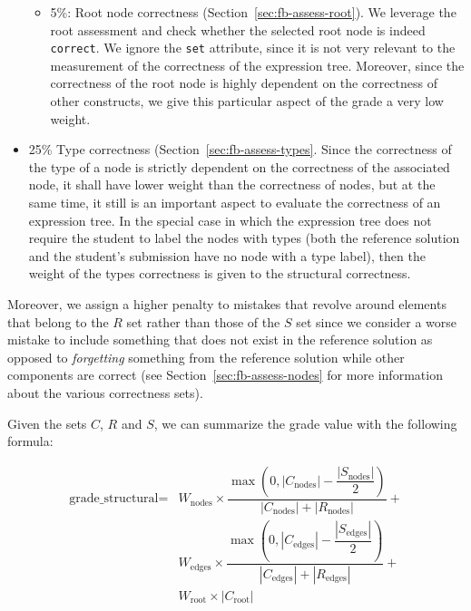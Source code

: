 \begin{chapterBody}
\begin{itemize}
\begin{itemize}
    \item 5\%: Root node correctness (Section~\ref{sec:fb-assess-root}). We 
leverage the root assessment and check whether the selected root node is
indeed \texttt{correct}. We ignore the \texttt{set} attribute, since
it is not very relevant to the measurement of the correctness of the
expression tree. Moreover, since the correctness of the root node is highly
dependent on the correctness of other constructs, we give this particular
aspect of the grade a very low weight.
    \end{itemize}
    \item 25\% Type correctness (Section~\ref{sec:fb-assess-types}. Since the
correctness of the type of a node is strictly dependent on the correctness of
the associated node, it shall have lower weight than the correctness of nodes,
but at the same time, it still is an important aspect to evaluate the correctness
of an expression tree. In the special case in which the expression tree does
not require the student to label the nodes with types (both the reference
solution and the student's submission have no node with a type label), then the
weight of the types correctness is given to the structural correctness.
\end{itemize}

Moreover, we assign a higher penalty to mistakes that revolve around elements
that belong to the $ R $ set rather than those of the $ S $ set since we 
consider a worse mistake to include something that does not exist in the
reference solution as opposed to \textit{forgetting} something from the
reference solution while other components are correct (see
Section~\ref{sec:fb-assess-nodes} for more information about the various
correctness sets).

Given the sets $ C $, $ R $ and $ S $, we can summarize the grade value with
the following formula:

\begin{equation*}
\begin{split}
\text{grade\_structural} =
  & W_{\text{nodes}} \times \dfrac{
    \max \left(
      0,
      \left| C_{\text{nodes}} \right| -
      \dfrac{\left| S_{\text{nodes}} \right|}{2}
    \right) 
  }{
    \left| C_{\text{nodes}} \right| + \left| R_{\text{nodes}} \right|
  } + \\
  & W_{\text{edges}} \times \dfrac{
    \max \left(
      0,
      \left| C_{\text{edges}} \right| -
      \dfrac{\left| S_{\text{edges}} \right|}{2}
    \right) 
  }{
    \left| C_{\text{edges}} \right| + \left| R_{\text{edges}} \right|
  } + \\
  & W_{\text{root}} \times \left| C_{\text{root}} \right|
\end{split}
\end{equation*}


\end{chapterBody}
